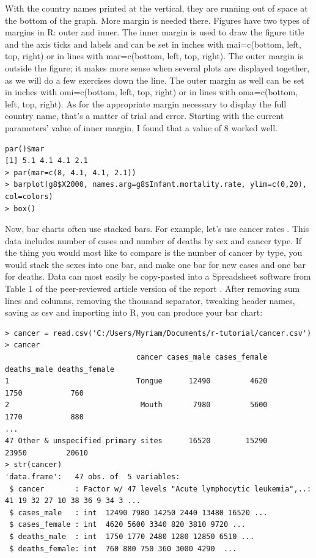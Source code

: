 \documentclass{report}
\newcommand{\code}[1]{\textsf{\ttfamily #1}}
\begin{document}
With the country names printed at the vertical, they are running out of space at the bottom of the graph. More margin is needed there. Figures have two types of margins in R: outer and inner. The inner margin is used to draw the figure title and the axis ticks and labels and can be set in inches with \code{mai=c(bottom, left, top, right)} or in lines with \code{mar=c(bottom, left, top, right)}. The outer margin is outside the figure; it makes more sense when several plots are displayed together, as we will do a few exercises down the line. The outer margin as well can be set in inches with \code{omi=c(bottom, left, top, right)} or in lines with \code{oma=c(bottom, left, top, right)}. As for the appropriate margin necessary to display the full country name, that's a matter of trial and error. Starting with the current parameters' value of inner margin, I found that a value of 8 worked well.
	\begin{verbatim}
par()$mar
[1] 5.1 4.1 4.1 2.1
> par(mar=c(8, 4.1, 4.1, 2.1))
> barplot(g8$X2000, names.arg=g8$Infant.mortality.rate, ylim=c(0,20), col=colors)
> box()
	\end{verbatim}

Now, bar charts often use stacked bars. For example, let's use cancer rates \cite{cancer}. This data includes number of cases and number of deaths by sex and cancer type. If the thing you would most like to compare is the number of cancer by type, you would stack the sexes into one bar, and make one bar for new cases and one bar for deaths.  Data can most easily be copy-pasted into a Spreadsheet software from Table 1 of  the peer-reviewed article version of the report \cite{siegel_cancer_2018}. After removing sum lines and columns, removing the thousand separator, tweaking header names, saving as csv and importing into R, you can produce your bar chart:
	\begin{verbatim}
> cancer = read.csv('C:/Users/Myriam/Documents/r-tutorial/cancer.csv')
> cancer
                              cancer cases_male cases_female deaths_male deaths_female
1                             Tongue      12490         4620        1750           760
2                              Mouth       7980         5600        1770           880
...
47 Other & unspecified primary sites      16520        15290       23950         20610
> str(cancer)
'data.frame':   47 obs. of  5 variables:
 $ cancer       : Factor w/ 47 levels "Acute lymphocytic leukemia",..: 41 19 32 27 10 38 36 9 34 3 ...
 $ cases_male   : int  12490 7980 14250 2440 13480 16520 ...
 $ cases_female : int  4620 5600 3340 820 3810 9720 ...
 $ deaths_male  : int  1750 1770 2480 1280 12850 6510 ...
 $ deaths_female: int  760 880 750 360 3000 4290  ...
	\end{verbatim}
\end{document}
